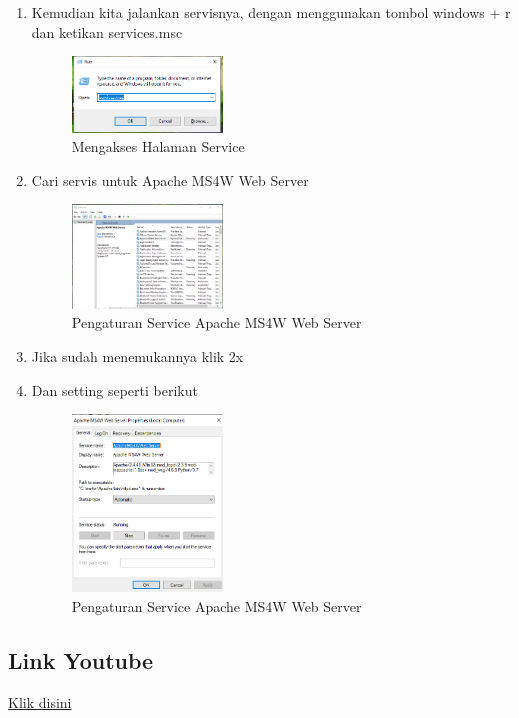 \begin{enumerate}
  \item Kemudian kita jalankan servisnya, dengan menggunakan tombol windows + r dan ketikan services.msc
  \hfill\break
    \begin{figure}[H]
		\includegraphics[width=4cm]{figures/1174002/4/7.png}
		\centering
		\caption{Mengakses Halaman Service}
    \end{figure}

  \item Cari servis untuk Apache MS4W Web Server
    \begin{figure}[H]
		\includegraphics[width=4cm]{figures/1174002/4/8.png}
		\centering
		\caption{Pengaturan Service Apache MS4W Web Server}
    \end{figure}

  \item Jika sudah menemukannya klik 2x
  \item Dan setting seperti berikut
  \hfill\break
    \begin{figure}[H]
		\includegraphics[width=4cm]{figures/1174002/4/9.png}
		\centering
		\caption{Pengaturan Service Apache MS4W Web Server}
    \end{figure}

\end{enumerate}



\subsection{Link Youtube}
\href{https://youtu.be/JQA5rCt7E40}{Klik disini}